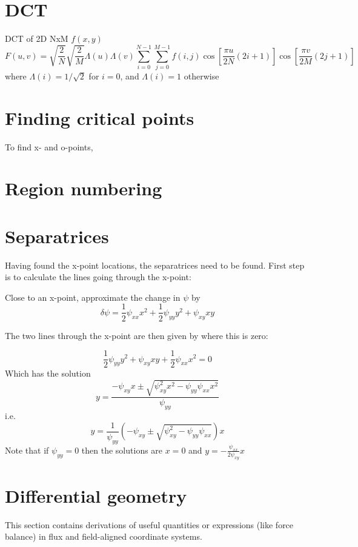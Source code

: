 \documentclass[12pt, a4paper]{article}
\begin{document}
\section{DCT}

DCT of 2D NxM $f\left(x,y\right)$
\[
F\left(u, v\right) = \sqrt{\frac{2}{N}}\sqrt{\frac{2}{M}}\Lambda\left(u\right)\Lambda\left(v\right)\sum_{i=0}^{N-1}\sum_{j=0}^{M-1} f\left(i, j\right) \cos\left[\frac{\pi u}{2N}\left(2i+1\right)\right]\cos\left[\frac{\pi v}{2M}\left(2j+1\right)\right]
\]
where $\Lambda\left(i\right) = 1/\sqrt{2}$ for $i=0$, and $\Lambda\left(i\right) = 1$ otherwise
 
\section{Finding critical points}

To find x- and o-points, 

\section{Region numbering}
\label{sec:numbering}


\section{Separatrices}

Having found the x-point locations, the separatrices need to be found.
First step is to calculate the lines going through the x-point:

Close to an x-point, approximate the change in $\psi$ by
\[
\delta\psi = \frac{1}{2}\psi_{xx} x^2 + \frac{1}{2}\psi_{yy}y^2 + \psi_{xy} xy
\]

The two lines through the x-point are then given by where this is zero:

\[
\frac{1}{2}\psi_{yy}y^2 + \psi_{xy}xy + \frac{1}{2}\psi_{xx} x^2 = 0
\]
Which has the solution
\[
y = \frac{ -\psi_{xy}x \pm \sqrt{\psi_{xy}^2x^2 - \psi_{yy}\psi_{xx}x^2}}{\psi_{yy}}
\]
i.e.
\[
y = \frac{1}{\psi_{yy}}\left(-\psi_{xy} \pm \sqrt{\psi_{xy}^2 - \psi_{yy}\psi_{xx}}\right)x
\]
Note that if $\psi_{yy} = 0$ then the solutions are $x = 0$ and $y = -\frac{\psi_{xx}}{2\psi_{xy}}x$

\section{Differential geometry}

This section contains derivations of useful quantities or expressions
(like force balance) in flux and field-aligned coordinate systems.
\end{document}
